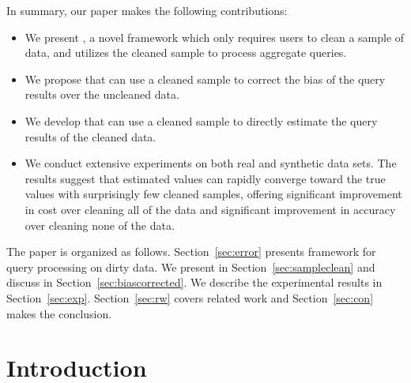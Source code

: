 \fi

In summary, our paper makes the following contributions:
\begin{itemize}\vspace{-.5em}
\item We present \saqpplus, a novel framework which only requires users to clean a sample of data, and utilizes the cleaned sample to process aggregate queries. \vspace{-.5em}
\item We propose \bias that can use a cleaned sample to correct the bias of the query results over the uncleaned data. \vspace{-.5em}
\item We develop \sampleclean that can use a cleaned sample to directly estimate the query results of the cleaned data.\vspace{-.5em}
\item We conduct extensive experiments on both real and synthetic data sets. The results suggest that estimated values can rapidly converge toward the true values with surprisingly few cleaned samples, offering significant improvement in cost over cleaning all of the data and significant improvement in accuracy over cleaning none of the data. \vspace{-.5em}
\end{itemize}


The paper is organized as follows. Section~\ref{sec:error} presents \saqpplus framework for query processing on dirty data. We present \sampleclean in Section~\ref{sec:sampleclean} and discuss \bias in Section~\ref{sec:biascorrected}. %
We describe the experimental results in Section~\ref{sec:exp}. Section~\ref{sec:rw} covers related work and Section~\ref{sec:con} makes the conclusion.


\iffalse

\section{Introduction}

